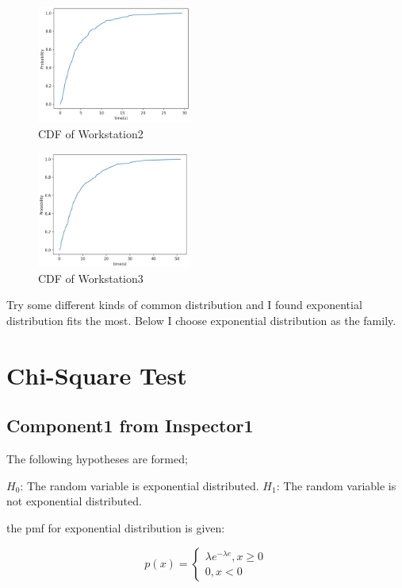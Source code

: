 \documentclass{article}
\begin{document}
\begin{figure}[htbp]
\begin{center}
\includegraphics[width=2in]{cdf5.png}
\caption{CDF of Workstation2}
\label{cdf5}
\end{center}
\end{figure}

\begin{figure}[htbp]
\begin{center}
\includegraphics[width=2in]{cdf6.png}
\caption{CDF of Workstation3}
\label{cdf6}
\end{center}
\end{figure}
Try some different kinds of common distribution and I found exponential distribution fits the most.
Below I choose exponential distribution as the family.


\section{Chi-Square Test}
\subsection{Component1 from Inspector1}
The following hypotheses are formed;

$H_0$: The random variable is exponential distributed.
$H_1$: The random variable is not exponential distributed.

the pmf for exponential distribution is given:

\begin{equation}
p(x) = \left\{
\begin{array}{rl}
\lambda e^{-\lambda e}, x\geq 0\\
0, x<0
\end{array}
\right.
\end{equation}
\end{document}
